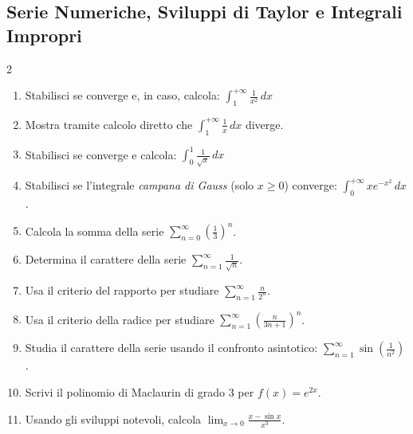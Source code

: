 \subsection{Serie Numeriche, Sviluppi di Taylor e Integrali Impropri}
\begin{multicols}{2}
\begin{enumerate}
    \item {} Stabilisci se converge e, in caso, calcola: $\int_1^{+\infty} \frac{1}{x^2} \, dx$
    \item {} Mostra tramite calcolo diretto che $\int_1^{+\infty} \frac{1}{x} \, dx$ diverge.
    \item {} Stabilisci se converge e calcola: $\int_0^1 \frac{1}{\sqrt{x}} \, dx$
    \item {} Stabilisci se l'integrale \textit{campana di Gauss} (solo $x \ge 0$) converge: $\int_0^{+\infty} x e^{-x^2} \, dx$.
    
    \item {} Calcola la somma della serie $\sum_{n=0}^\infty \left(\frac{1}{3}\right)^n$.
    \item {} Determina il carattere della serie $\sum_{n=1}^\infty \frac{1}{\sqrt{n}}$.
    \item {} Usa il criterio del rapporto per studiare $\sum_{n=1}^\infty \frac{n}{2^n}$.
    \item {} Usa il criterio della radice per studiare $\sum_{n=1}^\infty \left(\frac{n}{3n+1}\right)^n$.
    \item {} Studia il carattere della serie usando il confronto asintotico: $\sum_{n=1}^\infty \sin\left(\frac{1}{n^2}\right)$.
    \item {} Scrivi il polinomio di Maclaurin di grado 3 per $f(x) = e^{2x}$.
    \item {} Usando gli sviluppi notevoli, calcola $\lim_{x \to 0} \frac{x - \sin x}{x^3}$.
\end{enumerate}
\end{multicols}

